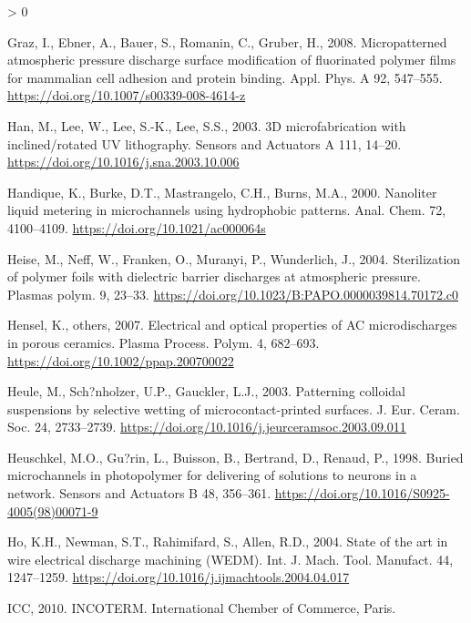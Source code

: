 \documentclass[
  11pt,
  twoside]{article}
\newlength{\cslhangindent}
\newenvironment{CSLReferences}[2] %
 {%
  \setlength{\parindent}{0pt}
  \ifodd #1 \everypar{\setlength{\hangindent}{\cslhangindent}}\ignorespaces\fi
  \ifnum #2 > 0
  \setlength{\parskip}{#2\baselineskip}
  \fi
 }%
 {}
\begin{document}
\begin{CSLReferences}{1}{0}
\leavevmode\hypertarget{ref-Graz08}{}%
Graz, I., Ebner, A., Bauer, S., Romanin, C., Gruber, H., 2008. Micropatterned atmospheric pressure discharge surface modification of fluorinated polymer films for mammalian cell adhesion and protein binding. Appl. Phys. A 92, 547--555. \url{https://doi.org/10.1007/s00339-008-4614-z}

\leavevmode\hypertarget{ref-Han04}{}%
Han, M., Lee, W., Lee, S.-K., Lee, S.S., 2003. {3D microfabrication with inclined/rotated UV lithography}. Sensors and Actuators A 111, 14--20. \url{https://doi.org/10.1016/j.sna.2003.10.006}

\leavevmode\hypertarget{ref-Hand00}{}%
Handique, K., Burke, D.T., Mastrangelo, C.H., Burns, M.A., 2000. {Nanoliter liquid metering in microchannels using hydrophobic patterns}. Anal. Chem. 72, 4100--4109. \url{https://doi.org/10.1021/ac000064s}

\leavevmode\hypertarget{ref-Hei04}{}%
Heise, M., Neff, W., Franken, O., Muranyi, P., Wunderlich, J., 2004. Sterilization of polymer foils with dielectric barrier discharges at atmospheric pressure. Plasmas polym. 9, 23--33. \url{https://doi.org/10.1023/B:PAPO.0000039814.70172.c0}

\leavevmode\hypertarget{ref-Hens07}{}%
Hensel, K., others, 2007. Electrical and optical properties of {AC} microdischarges in porous ceramics. Plasma Process. Polym. 4, 682--693. \url{https://doi.org/10.1002/ppap.200700022}

\leavevmode\hypertarget{ref-Heul04}{}%
Heule, M., Sch?nholzer, U.P., Gauckler, L.J., 2003. Patterning colloidal suspensions by selective wetting of microcontact-printed surfaces. J. Eur. Ceram. Soc. 24, 2733--2739. \url{https://doi.org/10.1016/j.jeurceramsoc.2003.09.011}

\leavevmode\hypertarget{ref-Heusch1998}{}%
Heuschkel, M.O., Gu?rin, L., Buisson, B., Bertrand, D., Renaud, P., 1998. Buried microchannels in photopolymer for delivering of solutions to neurons in a network. Sensors and Actuators B 48, 356--361. \url{https://doi.org/10.1016/S0925-4005(98)00071-9}

\leavevmode\hypertarget{ref-Ho04}{}%
Ho, K.H., Newman, S.T., Rahimifard, S., Allen, R.D., 2004. State of the art in wire electrical discharge machining {(WEDM)}. Int. J. Mach. Tool. Manufact. 44, 1247--1259. \url{https://doi.org/10.1016/j.ijmachtools.2004.04.017}

\leavevmode\hypertarget{ref-incoterm2010}{}%
ICC, 2010. INCOTERM. International Chember of Commerce, Paris.


\end{CSLReferences}
\end{document}
